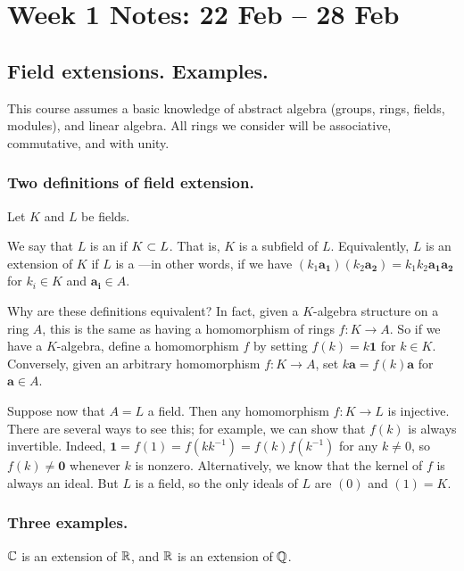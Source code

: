 \section{Week 1 Notes: 22 Feb -- 28 Feb}
\subsection{Field extensions. Examples.}

This course assumes a basic knowledge of abstract algebra (groups, rings, fields, modules), and linear algebra. All rings we consider will be associative, commutative, and with unity.

\subsubsection{Two definitions of field extension.}

Let $K$ and $L$ be fields.

\begin{defn}
We say that $L$ is an  if $K \subset L$. That is, $K$ is a subfield of $L$. Equivalently, $L$ is an extension of $K$ if $L$ is a ---in other words, if we have $(k_1 \mathbf{a_1})(k_2 \mathbf{a_2}) = k_1 k_2 \mathbf{a_1} \mathbf{a_2}$ for $k_i \in K$ and $\mathbf{a_i} \in A$.
\end{defn}

Why are these definitions equivalent? In fact, given a $K$-algebra structure on a ring $A$, this is the same as having a homomorphism of rings $f: K \to A$. So if we have a $K$-algebra, define a homomorphism $f$ by setting $f(k) = k \mathbf{1}$ for $k \in K$. Conversely, given an arbitrary homomorphism $f: K \to A$, set $k\mathbf{a} = f(k)\mathbf{a}$ for $\mathbf{a} \in A$.

Suppose now that $A = L$ a field. Then any homomorphism $f: K \to L$ is injective. There are several ways to see this; for example, we can show that $f(k)$ is always invertible. Indeed, $\mathbf{1} = f(1) = f(k k^{-1}) = f(k)f(k^{-1})$ for any $k \neq 0$, so $f(k) \neq \mathbf{0}$ whenever $k$ is nonzero. Alternatively, we know that the kernel of $f$ is always an ideal. But $L$ is a field, so the only ideals of $L$ are $(0)$ and $(1) = K$.

\subsubsection{Three examples.} 
\begin{ex}
$\mathbb{C}$ is an extension of $\mathbb{R}$, and $\mathbb{R}$ is an extension of $\mathbb{Q}$.
\end{ex}

